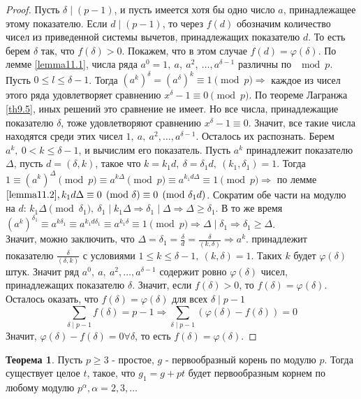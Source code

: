 \documentclass[a4paper, 12pt]{article}
\renewcommand{\phi}{\varphi}
\renewcommand{\div}{\mid}
\theoremstyle{definition}
\newtheorem{theorem}{Теорема}[section]
\begin{document}
    \begin{proof}
        Пусть $\delta \div (p-1)$, и пусть имеется хотя бы одно число $a$, принадлежащее этому показателю. Если $d\div (p-1)$, то через $f(d)$ обозначим количество чисел из приведенной системы вычетов, принадлежащих показателю $d$. То есть берем $\delta$ так, что $f(\delta)>0$. Покажем, что в этом случае $f(d)=\phi(\delta)$. По лемме \ref{lemma11.1}, числа ряда $a^0=1,\ a,\ a^2,\ \dots, a^{\delta-1}$ различны по $\mod{p}$. Пусть $0\leq l\leq \delta-1$. Тогда $(a^k)^{\delta}=(a^{\delta})^k\equiv 1\pmod{p} \Rightarrow$ каждое из чисел этого ряда удовлетворяет сравнению $x^{\delta}-1\equiv 0\pmod{p}$. По теореме Лагранжа \eqref{th9.5}, иных решений это сравнение не имеет. Но все числа, принадлежащие показателю $\delta$, тоже удовлетворяют сравнению $x^{\delta}-1\equiv 0$. Значит, все такие числа находятся среди этих чисел $1,\ a,\ a^2, \dots, a^{\delta-1}$. Осталось их распознать. Берем $a^k,\ 0<k\leq \delta-1$, и вычислим его показатель. Пусть $a^k$ принадлежит показателю $\Delta$, пусть $d=(\delta,k)$, такое что $k=k_1 d,\ \delta=\delta_1 d,\ (k_1, \delta_1)=1$. Тогда $1\equiv (a^k)^{\Delta} \pmod{p}\equiv a^{k\Delta}\pmod{p}\equiv a^{k_1d\Delta}\equiv 1\pmod{p} \Rightarrow $ по лемме $\ref{lemma11.2}, k_1d\Delta\equiv 0\pmod{\delta}\equiv 0\pmod{\delta_1 d}$. Сократим обе части на модулю на $d$: $k_1\Delta\pmod{\delta_1},\ \delta_1 \div k_1\Delta \Rightarrow \delta_1 \div \Delta \Rightarrow \Delta \geq \delta_1$. В то же время \\
        $(a^k)^{\delta_1}\equiv a^{k\delta_1}\equiv a^{k_1 d\delta_1}\equiv a^{k_1\delta}\equiv 1\pmod{p} \Rightarrow \Delta \div \delta_1 \Rightarrow \delta_1\geq \Delta$.\\
        Значит, можно заключить, что $\Delta=\delta_1=\frac{\delta}{d}=\frac{\delta}{(k,\delta)} \Rightarrow a^k$. принадлежит показателю $\frac{\delta}{(\delta, k)}$ с условиями $1\leq k \leq \delta-1,\ (k,\delta)=1$. Таких $k$ будет $\phi(\delta)$ штук. Значит ряд $a^0,\ a,\ a^2, \dots, a^{\delta-1}$ содержит ровно $\phi(\delta)$ чисел, принадлежащих показателю $\delta$. Значит, если $f(\delta)>0$, то $f(\delta)=\phi(\delta)$. Осталось оказать, что $f(\delta)=\phi(\delta)$ для всех $\delta \div p-1$
        \[\sum\limits_{\delta \div p-1}f(\delta)=p-1 \Rightarrow \sum\limits_{\delta \div p-1}(\phi(\delta)-f(\delta))=0\]
        Значит, $\phi(\delta)-f(\delta)=0 \forall \delta$, то есть $f(\delta)=\phi(\delta)$.
    \end{proof}
    \begin{theorem}\label{th11.2}
        Пусть $p\geq 3$ - простое, $g$ - первообразный корень по модулю $p$. Тогда существует целое $t$, такое, что $g_1=g+pt$ будет первообразным корнем по любому модулю $p^{\alpha}, \alpha=2,3,\dots$
    \end{theorem} 
\end{document}
